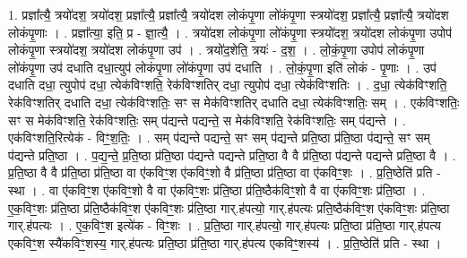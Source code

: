 \documentclass[17pt]{extarticle}
\begin{document}
1. प्रज्ञा᳚त्यै॒ त्रयो॑दश॒ त्रयो॑दश॒ प्रज्ञा᳚त्यै॒ प्रज्ञा᳚त्यै॒ त्रयो॑दश लोकंपृ॒णा लो॑कंपृ॒णा स्त्रयो॑दश॒ प्रज्ञा᳚त्यै॒ प्रज्ञा᳚त्यै॒ त्रयो॑दश लोकंपृ॒णाः । . प्रज्ञा᳚त्या॒ इति॒ प्र - ज्ञा॒त्यै॒ । . त्रयो॑दश लोकंपृ॒णा लो॑कंपृ॒णा स्त्रयो॑दश॒ त्रयो॑दश लोकंपृ॒णा उपोप॑ लोकंपृ॒णा स्त्रयो॑दश॒ त्रयो॑दश लोकंपृ॒णा उप॑ । . त्रयो॑द॒शेति॒ त्रयः॑ - द॒श॒ । . लो॒कं॒पृ॒णा उपोप॑ लोकंपृ॒णा लो॑कंपृ॒णा उप॑ दधाति दधा॒त्युप॑ लोकंपृ॒णा लो॑कंपृ॒णा उप॑ दधाति । . लो॒कं॒पृ॒णा इति॑ लोकं - पृ॒णाः । . उप॑ दधाति दधा॒ त्युपोप॑ दधा॒ त्येक॑विꣳशति॒ रेक॑विꣳशतिर् दधा॒ त्युपोप॑ दधा॒ त्येक॑विꣳशतिः । . द॒धा॒ त्येक॑विꣳशति॒ रेक॑विꣳशतिर् दधाति दधा॒ त्येक॑विꣳशतिः॒ सꣳ स मेक॑विꣳशतिर् दधाति दधा॒ त्येक॑विꣳशतिः॒ सम् । . एक॑विꣳशतिः॒ सꣳ स मेक॑विꣳशति॒ रेक॑विꣳशतिः॒ सम् प॑द्यन्ते पद्यन्ते॒ स मेक॑विꣳशति॒ रेक॑विꣳशतिः॒ सम् प॑द्यन्ते । . एक॑विꣳशति॒रित्येक॑ - विꣳ॒॒श॒तिः॒ । . सम् प॑द्यन्ते पद्यन्ते॒ सꣳ सम् प॑द्यन्ते प्रति॒ष्ठा प्र॑ति॒ष्ठा प॑द्यन्ते॒ सꣳ सम् प॑द्यन्ते प्रति॒ष्ठा । . प॒द्य॒न्ते॒ प्र॒ति॒ष्ठा प्र॑ति॒ष्ठा प॑द्यन्ते पद्यन्ते प्रति॒ष्ठा वै वै प्र॑ति॒ष्ठा प॑द्यन्ते पद्यन्ते प्रति॒ष्ठा वै । . प्र॒ति॒ष्ठा वै वै प्र॑ति॒ष्ठा प्र॑ति॒ष्ठा वा ए॑कविꣳ॒॒श ए॑कविꣳ॒॒शो वै प्र॑ति॒ष्ठा प्र॑ति॒ष्ठा वा ए॑कविꣳ॒॒शः । . प्र॒ति॒ष्ठेति॑ प्रति - स्था । . वा ए॑कविꣳ॒॒श ए॑कविꣳ॒॒शो वै वा ए॑कविꣳ॒॒शः प्र॑ति॒ष्ठा प्र॑ति॒ष्ठैक॑विꣳ॒॒शो वै वा ए॑कविꣳ॒॒शः प्र॑ति॒ष्ठा । . ए॒क॒विꣳ॒॒शः प्र॑ति॒ष्ठा प्र॑ति॒ष्ठैक॑विꣳ॒॒श ए॑कविꣳ॒॒शः प्र॑ति॒ष्ठा गार्.ह॑पत्यो॒ गार्.ह॑पत्यः प्रति॒ष्ठैक॑विꣳ॒॒श ए॑कविꣳ॒॒शः प्र॑ति॒ष्ठा गार्.ह॑पत्यः । . ए॒क॒विꣳ॒॒श इत्ये॑क - विꣳ॒॒शः । . प्र॒ति॒ष्ठा गार्.ह॑पत्यो॒ गार्.ह॑पत्यः प्रति॒ष्ठा प्र॑ति॒ष्ठा गार्.ह॑पत्य एकविꣳ॒॒श स्यै॑कविꣳ॒॒शस्य॒ गार्.ह॑पत्यः प्रति॒ष्ठा प्र॑ति॒ष्ठा गार्.ह॑पत्य एकविꣳ॒॒शस्य॑ । . प्र॒ति॒ष्ठेति॑ प्रति - स्था । \newline
\end{document}
